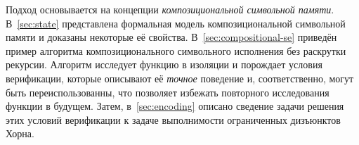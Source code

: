 Подход основывается на концепции \emph{композициональной символьной памяти}. В~\autoref{sec:state} представлена формальная модель композициональной символьной памяти и доказаны некоторые её свойства. В~\autoref{sec:compositional-se} приведён пример алгоритма композиционального символьного исполнения без раскрутки рекурсии. Алгоритм исследует функцию в изоляции и порождает условия верификации, которые описывают её \emph{точное} поведение и, соответственно, могут быть переиспользованны, что позволяет избежать повторного исследования функции в будущем. Затем, в~\autoref{sec:encoding} описано сведение задачи решения этих условий верификации к задаче выполнимости ограниченных дизъюнктов Хорна.
